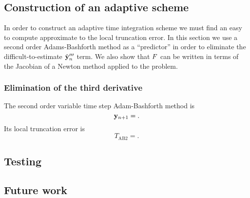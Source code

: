 \subsection{Construction of an adaptive scheme}

In order to construct an adaptive time integration scheme we must find an easy to compute approximate to the local truncation error.
In this section we use a second order Adams-Bashforth method as a ``predictor'' in order to eliminate the difficult-to-estimate $\hat{\mathbf{y}}_n'''$ term.\cite[p.274]{Gresho-Sani}
We also show that $F$ can be written in terms of the Jacobian of a Newton method applied to the problem.

\subsubsection{Elimination of the third derivative}
The second order variable time step Adam-Bashforth method is\cite{??ds}
\begin{equation}
  \mathbf{y}_{n+1} = .
  \label{eq:AB2}
\end{equation}
Its local truncation error is\cite{??ds}
\begin{equation}
  T_{\text{AB2}} = .
  \label{eq:AB2LTE}
\end{equation}




\subsection{Testing}




\subsection{Future work}




